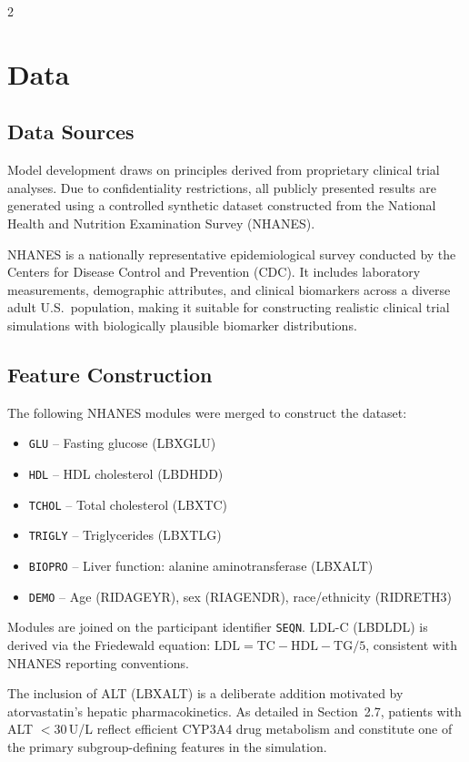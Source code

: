 \documentclass[12pt]{article}
\begin{document}
\begin{multicols}{2}
\section{Data}

\subsection{Data Sources}

Model development draws on principles derived from proprietary clinical trial
analyses.  Due to confidentiality restrictions, all publicly presented results
are generated using a controlled synthetic dataset constructed from the
National Health and Nutrition Examination Survey (NHANES).

NHANES is a nationally representative epidemiological survey conducted by
the Centers for Disease Control and Prevention (CDC).  It includes
laboratory measurements, demographic attributes, and clinical biomarkers
across a diverse adult U.S.\ population, making it suitable for constructing
realistic clinical trial simulations with biologically plausible biomarker
distributions.

\subsection{Feature Construction}

The following NHANES modules were merged to construct the dataset:
\begin{itemize}
\item \texttt{GLU} -- Fasting glucose (LBXGLU)
\item \texttt{HDL} -- HDL cholesterol (LBDHDD)
\item \texttt{TCHOL} -- Total cholesterol (LBXTC)
\item \texttt{TRIGLY} -- Triglycerides (LBXTLG)
\item \texttt{BIOPRO} -- Liver function: alanine aminotransferase (LBXALT)
\item \texttt{DEMO} -- Age (RIDAGEYR), sex (RIAGENDR),
  race/ethnicity (RIDRETH3)
\end{itemize}
Modules are joined on the participant identifier \texttt{SEQN}.
LDL-C (LBDLDL) is derived via the Friedewald equation:
$\text{LDL} = \text{TC} - \text{HDL} - \text{TG}/5$,
consistent with NHANES reporting conventions.

The inclusion of ALT (LBXALT) is a deliberate addition motivated by
atorvastatin's hepatic pharmacokinetics.  As detailed in Section~2.7,
patients with ALT $<$30\,U/L reflect efficient CYP3A4 drug metabolism and
constitute one of the primary subgroup-defining features in the simulation.


\end{multicols}
\end{document}
